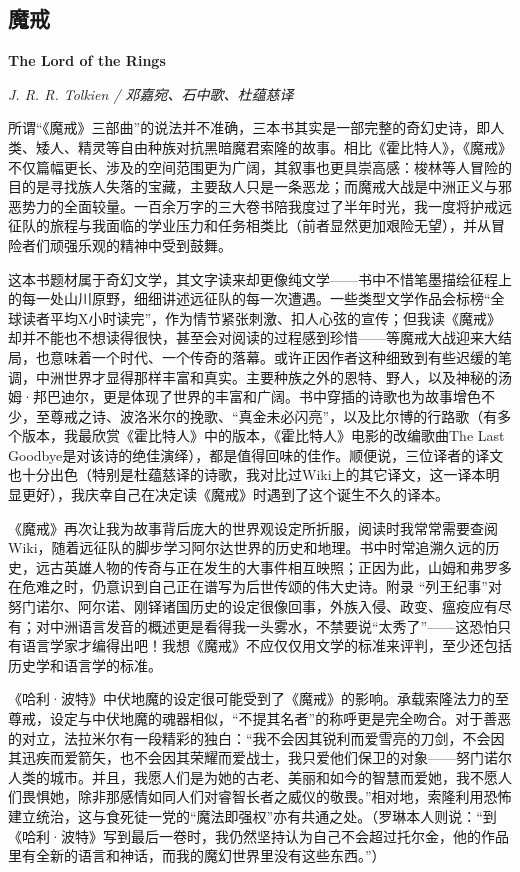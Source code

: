\subsection*{魔戒}
\par \textbf{The Lord of the Rings}
\par \emph{J. R. R. Tolkien / 邓嘉宛、石中歌、杜蕴慈译} 

\par 所谓“《魔戒》三部曲”的说法并不准确，三本书其实是一部完整的奇幻史诗，即人类、矮人、精灵等自由种族对抗黑暗魔君索隆的故事。相比《霍比特人》，《魔戒》不仅篇幅更长、涉及的空间范围更为广阔，其叙事也更具崇高感：梭林等人冒险的目的是寻找族人失落的宝藏，主要敌人只是一条恶龙；而魔戒大战是中洲正义与邪恶势力的全面较量。一百余万字的三大卷书陪我度过了半年时光，我一度将护戒远征队的旅程与我面临的学业压力和任务相类比（前者显然更加艰险无望），并从冒险者们顽强乐观的精神中受到鼓舞。
\par 这本书题材属于奇幻文学，其文字读来却更像纯文学——书中不惜笔墨描绘征程上的每一处山川原野，细细讲述远征队的每一次遭遇。一些类型文学作品会标榜“全球读者平均X小时读完”，作为情节紧张刺激、扣人心弦的宣传；但我读《魔戒》却并不能也不想读得很快，甚至会对阅读的过程感到珍惜——等魔戒大战迎来大结局，也意味着一个时代、一个传奇的落幕。或许正因作者这种细致到有些迟缓的笔调，中洲世界才显得那样丰富和真实。主要种族之外的恩特、野人，以及神秘的汤姆·邦巴迪尔，更是体现了世界的丰富和广阔。书中穿插的诗歌也为故事增色不少，至尊戒之诗、波洛米尔的挽歌、“真金未必闪亮”，以及比尔博的行路歌（有多个版本，我最欣赏《霍比特人》中的版本，《霍比特人》电影的改编歌曲The Last Goodbye是对该诗的绝佳演绎），都是值得回味的佳作。顺便说，三位译者的译文也十分出色（特别是杜蕴慈译的诗歌，我对比过Wiki上的其它译文，这一译本明显更好），我庆幸自己在决定读《魔戒》时遇到了这个诞生不久的译本。
\par 《魔戒》再次让我为故事背后庞大的世界观设定所折服，阅读时我常常需要查阅Wiki，随着远征队的脚步学习阿尔达世界的历史和地理。书中时常追溯久远的历史，远古英雄人物的传奇与正在发生的大事件相互映照；正因为此，山姆和弗罗多在危难之时，仍意识到自己正在谱写为后世传颂的伟大史诗。附录 “列王纪事”对努门诺尔、阿尔诺、刚铎诸国历史的设定很像回事，外族入侵、政变、瘟疫应有尽有；对中洲语言发音的概述更是看得我一头雾水，不禁要说“太秀了”——这恐怕只有语言学家才编得出吧！我想《魔戒》不应仅仅用文学的标准来评判，至少还包括历史学和语言学的标准。
\par 《哈利·波特》中伏地魔的设定很可能受到了《魔戒》的影响。承载索隆法力的至尊戒，设定与中伏地魔的魂器相似，“不提其名者”的称呼更是完全吻合。对于善恶的对立，法拉米尔有一段精彩的独白：“我不会因其锐利而爱雪亮的刀剑，不会因其迅疾而爱箭矢，也不会因其荣耀而爱战士，我只爱他们保卫的对象——努门诺尔人类的城市。并且，我愿人们是为她的古老、美丽和如今的智慧而爱她，我不愿人们畏惧她，除非那感情如同人们对睿智长者之威仪的敬畏。”相对地，索隆利用恐怖建立统治，这与食死徒一党的“魔法即强权”亦有共通之处。（罗琳本人则说：“到《哈利·波特》写到最后一卷时，我仍然坚持认为自己不会超过托尔金，他的作品里有全新的语言和神话，而我的魔幻世界里没有这些东西。”）
